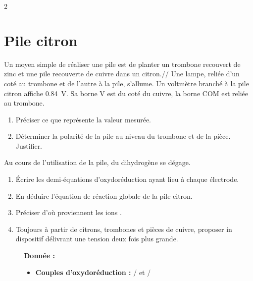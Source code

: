 \documentclass[a4paper,11pt,fleqn]{article}%
\begin{document}
\begin{multicols}{2}
\section{Pile citron}
Un moyen simple de réaliser une pile est de planter un trombone recouvert de zinc et une pile recouverte de cuivre dans un citron.//
Une lampe, reliée d'un coté au trombone et de l'autre à la pile, s'allume. Un voltmètre branché à la pile citron affiche \SI{0,84}{\volt}. Sa borne V est du coté du cuivre, la borne COM est reliée au trombone.
\begin{enumerate}
    \item Préciser ce que représente la valeur mesurée.
    \item Déterminer la polarité de la pile au niveau du trombone et de la pièce. Justifier.
\end{enumerate}
Au cours de l'utilisation de la pile, du dihydrogène  se dégage.
\begin{enumerate}[resume]
    \item Écrire les demi-équations d'oxydoréduction ayant lieu à chaque électrode.
    \item En déduire l'équation de réaction globale de la pile citron.
    \item Préciser d'où proviennent les ions .
    \item Toujours à partir de citrons, trombones et pièces de cuivre, proposer in dispositif délivrant une tension deux fois plus grande.
\end{enumerate}

\begin{figure}[H]
    \begin{minipage}{\linewidth}
    \textbf{Donnée :}
    \begin{itemize}
        \item \textbf{Couples d'oxydoréduction :} / et /
    \end{itemize}
    \end{minipage}
\end{figure}


\end{multicols}
\end{document}
